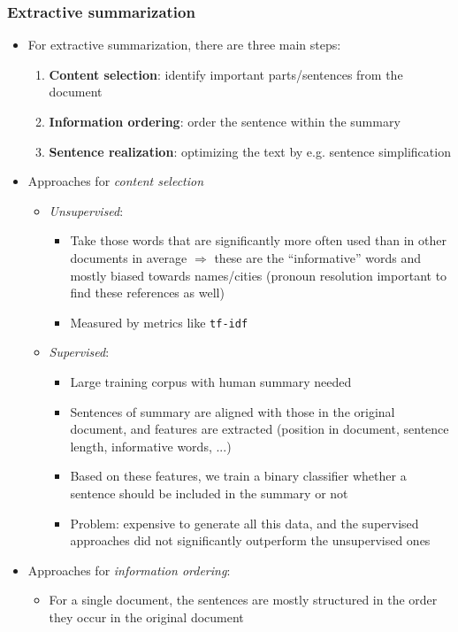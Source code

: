 \subsubsection{Extractive summarization}
\begin{itemize}
	\item For extractive summarization, there are three main steps:
	\begin{enumerate}
		\item \textbf{Content selection}: identify important parts/sentences from the document 
		\item \textbf{Information ordering}: order the sentence within the summary
		\item \textbf{Sentence realization}: optimizing the text by e.g. sentence simplification
	\end{enumerate}
	\item Approaches for \textit{content selection}
	\begin{itemize}
		\item \textit{Unsupervised}: 
		\begin{itemize}
			\item Take those words that are significantly more often used than in other documents in average $\Rightarrow$ these are the ``informative'' words and mostly biased towards names/cities (pronoun resolution important to find these references as well)
			\item Measured by metrics like \texttt{tf-idf}
		\end{itemize}
		\item \textit{Supervised}:
		\begin{itemize}
			\item Large training corpus with human summary needed
			\item Sentences of summary are aligned with those in the original document, and features are extracted (position in document, sentence length, informative words, ...)
			\item Based on these features, we train a binary classifier whether a sentence should be included in the summary or not
			\item Problem: expensive to generate all this data, and the supervised approaches did not significantly outperform the unsupervised ones
		\end{itemize}
	\end{itemize}
	\item Approaches for \textit{information ordering}:
	\begin{itemize}
		\item For a single document, the sentences are mostly structured in the order they occur in the original document
	\end{itemize}
\end{itemize}
